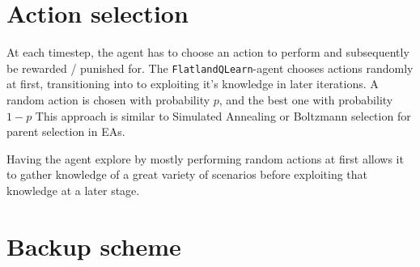 \documentclass[twoside]{article}
\begin{document}
\begin{multicols}{2}
    \section{Action selection}

    At each timestep, the agent has to choose an action to perform and subsequently be rewarded / punished for.
    The \texttt{FlatlandQLearn}-agent chooses actions randomly at first, transitioning into to exploiting it's knowledge in later iterations.
    A random action is chosen with probability $p$, and the best one with probability $1 - p$
    This approach is similar to Simulated Annealing or Boltzmann selection for parent selection in EAs.
    
    Having the agent explore by mostly performing random actions at first allows it to gather knowledge of a great variety of scenarios before exploiting that knowledge at a later stage.

    \section{Backup scheme}

    
    


\end{multicols}

%
%
\end{document}
